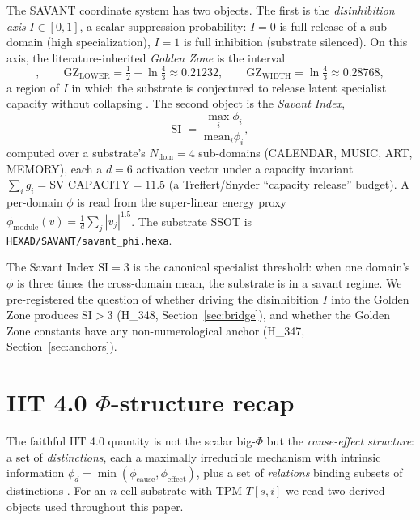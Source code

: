 \documentclass[11pt,a4paper]{article}
\newcommand{\GZL}{\mathrm{GZ_{LOWER}}}
\newcommand{\GZW}{\mathrm{GZ_{WIDTH}}}
\newcommand{\Svi}{\mathrm{SI}}
\begin{document}
The SAVANT coordinate system has two objects. The first is the
\emph{disinhibition axis} $I\in[0,1]$, a scalar suppression probability:
$I=0$ is full release of a sub-domain (high specialization), $I=1$ is full
inhibition (substrate silenced). On this axis, the literature-inherited
\emph{Golden Zone} is the interval
\begin{equation}
[\GZL,\ \GZL+\GZW], \qquad
\GZL = \tfrac12 - \ln\tfrac43 \approx 0.21232, \qquad
\GZW = \ln\tfrac43 \approx 0.28768 ,
\end{equation}
a region of $I$ in which the substrate is conjectured to release latent
specialist capacity without collapsing
\citep{snyder2009explaining,treffert2009savant}. The second object is the
\emph{Savant Index},
\begin{equation}
\Svi \;=\; \frac{\max_i \phi_i}{\mathrm{mean}_i \phi_i},
\label{eq:si}
\end{equation}
computed over a substrate's $N_{\mathrm{dom}}=4$ sub-domains
(CALENDAR, MUSIC, ART, MEMORY), each a $d=6$ activation vector under a
capacity invariant $\sum_i g_i = \mathrm{SV\_CAPACITY}=11.5$ (a
Treffert/Snyder ``capacity release'' budget). A per-domain $\phi$ is read
from the super-linear energy proxy
$\phi_{\mathrm{module}}(v)=\tfrac1d\sum_j |v_j|^{1.5}$.
The substrate SSOT is \texttt{HEXAD/SAVANT/savant\_phi.hexa}.

The Savant Index $\Svi=3$ is the canonical specialist threshold: when one
domain's $\phi$ is three times the cross-domain mean, the substrate is in
a savant regime. We pre-registered the question of whether driving the
disinhibition $I$ into the Golden Zone produces $\Svi>3$ (H\_348,
Section~\ref{sec:bridge}), and whether the Golden Zone constants have any
non-numerological anchor (H\_347, Section~\ref{sec:anchors}).

\section{IIT 4.0 $\Phi$-structure recap}
\label{sec:iit4}

The faithful IIT 4.0 quantity is not the scalar big-$\Phi$ but the
\emph{cause-effect structure}: a set of \emph{distinctions}, each a
maximally irreducible mechanism with intrinsic information
$\phi_d = \min(\phi_{\mathrm{cause}}, \phi_{\mathrm{effect}})$, plus a set
of \emph{relations} binding subsets of distinctions
\citep{albantakis2023iit4}. For an $n$-cell substrate with TPM
$T[s,i]$ we read two derived objects used throughout this paper.
\end{document}
